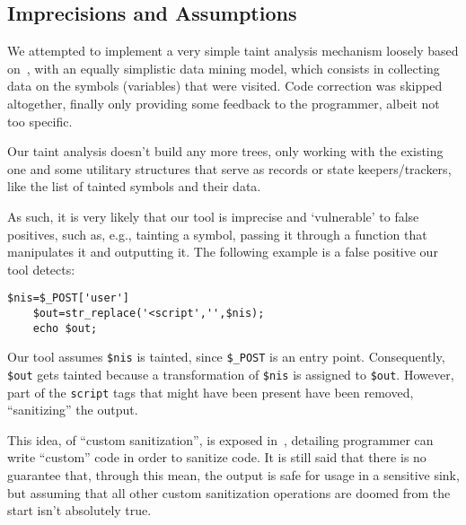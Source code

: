 \subsection*{Imprecisions and Assumptions}
\label{sec:discussion.imprecisions}

We attempted to implement a very simple taint analysis mechanism loosely based
on~\cite{Medeiros:2014:ADC:2566486.2568024}, with an equally simplistic data
mining model, which consists in collecting data on the symbols (variables) that
were visited. Code correction was skipped altogether, finally only providing
some feedback to the programmer, albeit not too specific.

Our taint analysis doesn't build any more trees, only working with the existing
one and some utilitary structures that serve as records or state
keepers/trackers, like the list of tainted symbols and their data.

As such, it is very likely that our tool is imprecise and `vulnerable' to false
positives, such as, e.g., tainting a symbol, passing it through a function that
manipulates it and outputting it. The following example is a false positive our
tool detects:

\begin{lstlisting}[label={lst:php.example.xss.false},
        caption={Example of custom sanitization that triggers XSS false
        positive}]
    $nis=$_POST['user']
    $out=str_replace('<script','',$nis);
    echo $out;
\end{lstlisting}

Our tool assumes \verb|$nis| is tainted, since \verb|$_POST| is an entry point.
Consequently, \verb|$out| gets tainted because a transformation of \verb|$nis|
is assigned to \verb|$out|. However, part of the \verb|script| tags that might
have been present have been removed, ``sanitizing'' the output.

This idea, of ``custom sanitization'', is exposed in~\cite{Balzarotti:2008},
detailing programmer can write ``custom'' code in order to sanitize code. It is
still said that there is no guarantee that, through this mean, the output is
safe for usage in a sensitive sink, but assuming that all other custom
sanitization operations are doomed from the start isn't absolutely true.
